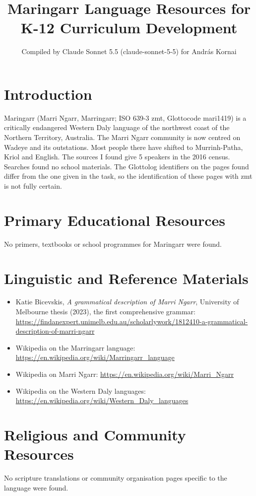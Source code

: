 \documentclass[12pt]{article}
\title{Maringarr Language Resources for K-12 Curriculum Development}
\author{Compiled by Claude Sonnet 5.5 (claude-sonnet-5-5) for Andr\'as Kornai}
\date{}
\begin{document}
\maketitle

\section{Introduction}
Maringarr (Marri Ngarr, Marringarr; ISO 639-3 zmt, Glottocode mari1419) is a critically endangered Western Daly language of the northwest coast of the Northern Territory, Australia. The Marri Ngarr community is now centred on Wadeye and its outstations. Most people there have shifted to Murrinh-Patha, Kriol and English. The sources I found give 5 speakers in the 2016 census. Searches found no school materials. The Glottolog identifiers on the pages found differ from the one given in the task, so the identification of these pages with zmt is not fully certain.

\section{Primary Educational Resources}
No primers, textbooks or school programmes for Maringarr were found.

\section{Linguistic and Reference Materials}
\begin{itemize}
\item Katie Bicevskis, \emph{A grammatical description of Marri Ngarr}, University of Melbourne thesis (2023), the first comprehensive grammar: \url{https://findanexpert.unimelb.edu.au/scholarlywork/1812410-a-grammatical-description-of-marri-ngarr}
\item Wikipedia on the Marringarr language: \url{https://en.wikipedia.org/wiki/Marringarr_language}
\item Wikipedia on Marri Ngarr: \url{https://en.wikipedia.org/wiki/Marri_Ngarr}
\item Wikipedia on the Western Daly languages: \url{https://en.wikipedia.org/wiki/Western_Daly_languages}
\end{itemize}

\section{Religious and Community Resources}
No scripture translations or community organisation pages specific to the language were found.
\end{document}
